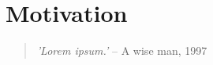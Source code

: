 \section{Motivation}

\begin{quote}
    \begin{center}
        \emph{'Lorem ipsum.'}   -- A wise man, 1997
    \end{center}
\end{quote}